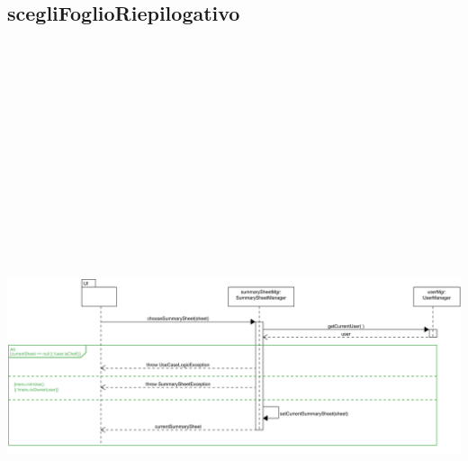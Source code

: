 \subsection{scegliFoglioRiepilogativo}
\centering\includegraphics[max width=\textwidth, max height=190mm]{../resources/img/GCC/DSD/op1a.png}

